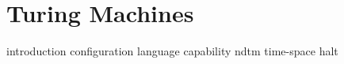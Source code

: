 \chapter{Turing Machines}

{introduction}
{configuration}
{language}
{capability}
{ndtm}
{time-space}
{halt}









